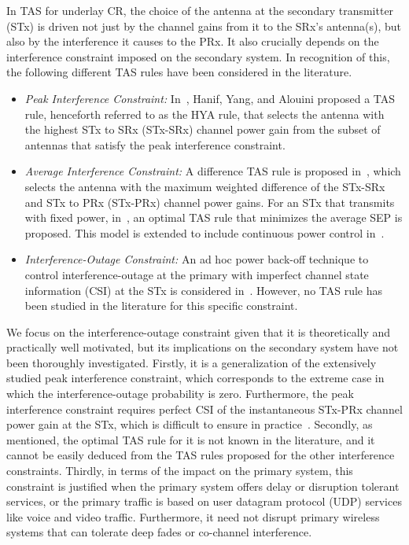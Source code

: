 \documentclass[journal]{IEEEtran}
\begin{document}
In TAS for underlay CR, the choice of the antenna at the secondary transmitter (STx) is driven not just by the channel gains from it to the SRx's antenna(s), but also by the interference it causes to the PRx. It also crucially depends on the interference constraint imposed on the secondary system. In recognition of this, the following different TAS rules have been considered in the literature.
%
\begin{itemize}
\item {\em Peak Interference Constraint:} In~\cite{Hanif_2015_globecom}, Hanif, Yang, and Alouini proposed a TAS rule, henceforth referred to as the HYA rule, that selects the antenna with the highest STx to SRx (STx-SRx) channel power gain from the subset of antennas that satisfy the peak interference constraint.  
%
\item {\em Average Interference Constraint:} A difference TAS rule is proposed in~\cite{Wang_2011_TCom}, which selects the antenna with the maximum weighted difference of the STx-SRx and  STx to PRx (STx-PRx) channel power gains. For an STx that transmits with fixed power, in~\cite{Sarvendranath_2013_TCOM}, an optimal TAS rule that minimizes the average SEP is proposed. This model is extended to include continuous power control in~\cite{Sarvendranath_2014_TCOM}. 
%
\item{\em Interference-Outage Constraint:} An ad hoc power back-off technique to control interference-outage at the primary with imperfect channel state information (CSI) at the STx is considered in~\cite{Peng_2016_eurasip}. However, no TAS rule has been studied  in the literature for this specific constraint. 

\end{itemize}


We focus on the interference-outage constraint given that it is theoretically and practically well motivated, but its implications on the secondary system have not been thoroughly investigated. Firstly, it is a generalization of the extensively studied peak interference constraint, which corresponds to the extreme case in which the interference-outage probability is zero.  Furthermore, the peak interference constraint requires perfect  CSI of the instantaneous STx-PRx channel power gain at the STx, which is difficult to ensure in practice~\cite{musavian_2009_tcom,Suraweera_2010_TVT,Peng_2016_eurasip}. Secondly, as mentioned, the optimal TAS rule for it is not known in the literature, and it cannot be easily deduced from the TAS rules proposed for the other interference constraints. Thirdly, in terms of the impact on the primary system, this constraint is justified when the primary system offers delay or disruption tolerant services, or the primary traffic is based on user datagram protocol (UDP) services like voice and video traffic. Furthermore, it need not disrupt  primary wireless systems that can tolerate deep fades or co-channel interference. 
\end{document}
